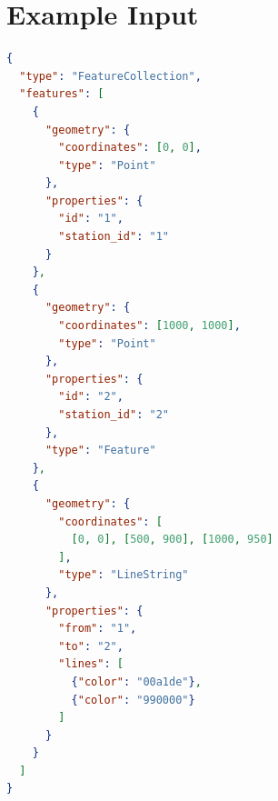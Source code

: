 \documentclass[10pt,a4paper]{article}
\begin{document}
\section{Example Input}


\begin{lstlisting}[language=json,firstnumber=1]
{
  "type": "FeatureCollection",
  "features": [
    {
      "geometry": {
        "coordinates": [0, 0],
        "type": "Point"
      },
      "properties": {
        "id": "1",
        "station_id": "1"
      }
    },
    {
      "geometry": {
        "coordinates": [1000, 1000],
        "type": "Point"
      },
      "properties": {
        "id": "2",
        "station_id": "2"
      },
      "type": "Feature"
    },
    {
      "geometry": {
        "coordinates": [
          [0, 0], [500, 900], [1000, 950]
        ],
        "type": "LineString"
      },
      "properties": {
        "from": "1",
        "to": "2",
        "lines": [
          {"color": "00a1de"},
          {"color": "990000"}
        ]
      }
    }
  ]
}
\end{lstlisting}
\end{document}
